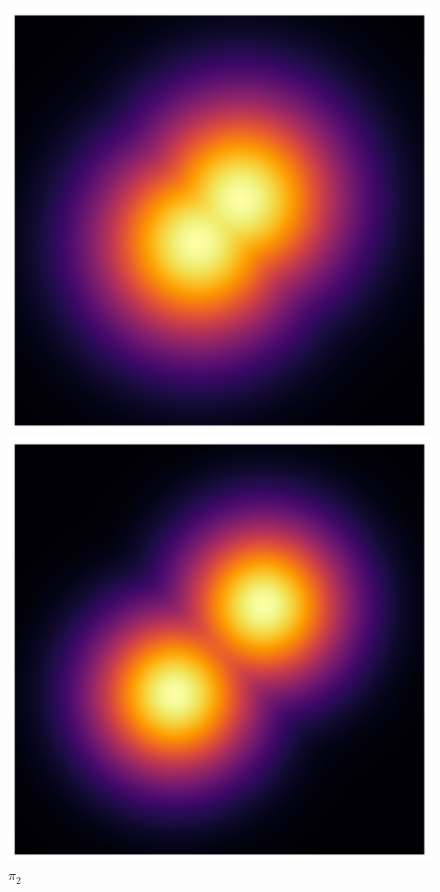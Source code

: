 \begin{figure}[t]
\begin{minipage}{0.15\textwidth}
      \includegraphics[width=\textwidth]{../img/heatmap_path_2.pdf}
      \caption*{$\pi_2$}
    \end{minipage}
    \begin{minipage}{0.15\textwidth}
      \centering
      \includegraphics[width=\textwidth]{../img/heatmap_path_3.pdf}

\end{minipage}
\end{figure}

